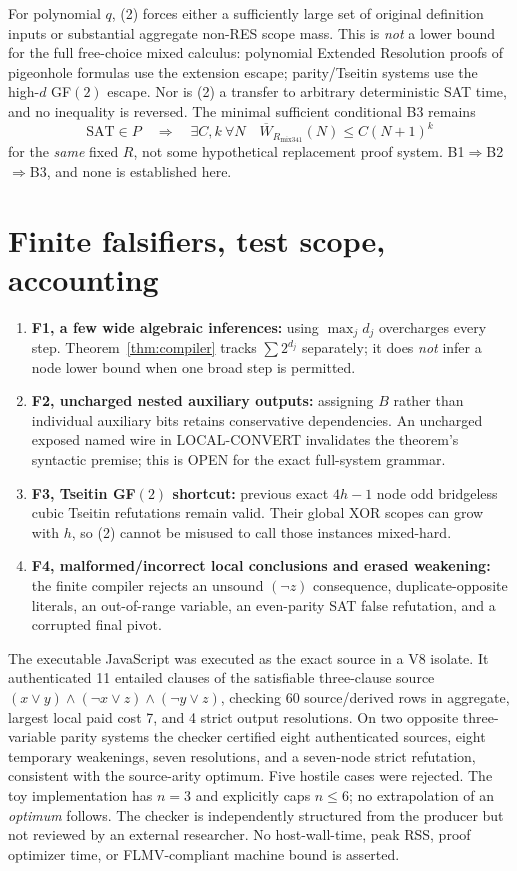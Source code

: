 \documentclass[11pt]{article}
\begin{document}
For polynomial $q$, (2) forces either a sufficiently large set of original definition inputs or substantial aggregate non-RES scope mass. This is \emph{not} a lower bound for the full free-choice mixed calculus: polynomial Extended Resolution proofs of pigeonhole formulas use the extension escape; parity/Tseitin systems use the high-$d$ GF$(2)$ escape. Nor is (2) a transfer to arbitrary deterministic SAT time, and no inequality is reversed. The minimal sufficient conditional B3 remains
\[
\mathrm{SAT}\in P\quad\Longrightarrow\quad
\exists C,k\ \forall N\quad
\overline W_{R_{\mathrm{mix341}}}(N)\le C(N+1)^k
\tag{B3}
\]
for the \emph{same} fixed $R$, not some hypothetical replacement proof system. B1$\Rightarrow$B2$\Rightarrow$B3, and none is established here.

\section*{Finite falsifiers, test scope, accounting}
\begin{enumerate}
\item[] \textbf{F1, a few wide algebraic inferences:} using $\max_jd_j$ overcharges every step. Theorem~\ref{thm:compiler} tracks $\sum 2^{d_j}$ separately; it does \emph{not} infer a node lower bound when one broad step is permitted.
\item[] \textbf{F2, uncharged nested auxiliary outputs:} assigning $B$ rather than individual auxiliary bits retains conservative dependencies. An uncharged exposed named wire in LOCAL-CONVERT invalidates the theorem's syntactic premise; this is OPEN for the exact full-system grammar.
\item[] \textbf{F3, Tseitin GF$(2)$ shortcut:} previous exact $4h-1$ node odd bridgeless cubic Tseitin refutations remain valid. Their global XOR scopes can grow with $h$, so (2) cannot be misused to call those instances mixed-hard.
\item[] \textbf{F4, malformed/incorrect local conclusions and erased weakening:} the finite compiler rejects an unsound $(\neg z)$ consequence, duplicate-opposite literals, an out-of-range variable, an even-parity SAT false refutation, and a corrupted final pivot.
\end{enumerate}
The executable JavaScript was executed as the exact source in a V8 isolate. It authenticated 11 entailed clauses of the satisfiable three-clause source $(x\vee y)\wedge(\neg x\vee z)\wedge(\neg y\vee z)$, checking 60 source/derived rows in aggregate, largest local paid cost 7, and 4 strict output resolutions. On two opposite three-variable parity systems the checker certified eight authenticated sources, eight temporary weakenings, seven resolutions, and a seven-node strict refutation, consistent with the source-arity optimum. Five hostile cases were rejected. The toy implementation has $n=3$ and explicitly caps $n\le6$; no extrapolation of an \emph{optimum} follows. The checker is independently structured from the producer but not reviewed by an external researcher. No host-wall-time, peak RSS, proof optimizer time, or FLMV-compliant machine bound is asserted.
\end{document}
